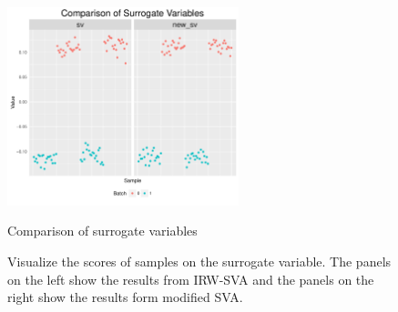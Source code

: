 \documentclass[11pt]{article}
\begin{document}
\begin{figure}[h!]
    \centering
    \includegraphics[width = 0.6\textwidth]{figures/vector2.pdf}
    \caption{Comparison of surrogate variables}
    \label{fig:vector2}
    \caption{Visualize the scores of samples on the surrogate variable. The panels on the left show the results from IRW-SVA and the panels on the right show the results form modified SVA.}
\end{figure}

\newpage
\clearpage



\end{document}
